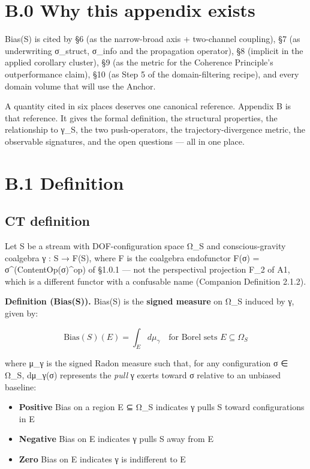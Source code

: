 \documentclass[11pt, openany]{book}
\newcommand{\sectionbreak}{\clearpage}
\begin{document}
\sectionbreak

\section{B.0 Why this appendix exists}

Bias(S) is cited by §6 (as the narrow-broad axis + two-channel coupling), §7 (as underwriting σ\_\allowbreak{}struct, σ\_\allowbreak{}info and the propagation operator), §8 (implicit in the applied corollary cluster), §9 (as the metric for the Coherence Principle's outperformance claim), §10 (as Step 5 of the domain-filtering recipe), and every domain volume that will use the Anchor.

A quantity cited in six places deserves one canonical reference. Appendix B is that reference. It gives the formal definition, the structural properties, the relationship to γ\_\allowbreak{}S, the two push-operators, the trajectory-divergence metric, the observable signatures, and the open questions --- all in one place.

\sectionbreak

\section{B.1 Definition}

\subsection{CT definition}

Let S be a stream with DOF-configuration space Ω\_\allowbreak{}S and conscious-gravity coalgebra γ : S → F(S), where F is the coalgebra endofunctor F(σ) = σ\textasciicircum{}(ContentOp(σ)\textasciicircum{}op) of §1.0.1 --- not the perspectival projection F\_\allowbreak{}2 of A1, which is a different functor with a confusable name (Companion Definition 2.1.2).

\textbf{Definition (Bias(S)).} Bias(S) is the \textbf{signed measure} on Ω\_\allowbreak{}S induced by γ, given by:

$$\text{Bias}(S)(E) = \int_E d\mu_\gamma \quad \text{for Borel sets } E \subseteq \Omega_S$$

where μ\_\allowbreak{}γ is the signed Radon measure such that, for any configuration σ ∈ Ω\_\allowbreak{}S, dμ\_\allowbreak{}γ(σ) represents the \textit{pull} γ exerts toward σ relative to an unbiased baseline:

\begin{itemize}
\item \textbf{Positive} Bias on a region E ⊆ Ω\_\allowbreak{}S indicates γ pulls S toward configurations in E
\item \textbf{Negative} Bias on E indicates γ pulls S away from E
\item \textbf{Zero} Bias on E indicates γ is indifferent to E
\end{itemize}
\end{document}
